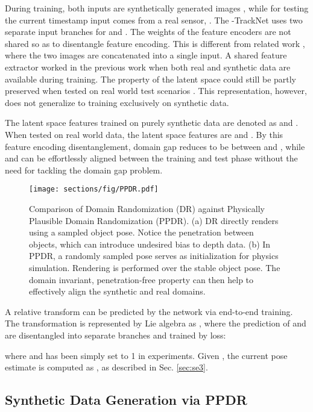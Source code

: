 \documentclass[letterpaper, 10 pt, conference]{ieeeconf}
\begin{document}
During training, both inputs are synthetically generated images , while for testing the current timestamp input comes from a real sensor, . The -TrackNet uses two separate input branches for  and . The weights of the feature encoders are not shared so as to disentangle feature encoding. This is different from related work \cite{li2018deepim}, where the two images are concatenated into a single input. A shared feature extractor worked in the previous work when both real and synthetic data are available during training. The property of the latent space  could still be partly preserved when tested on real world test scenarios . This representation, however, does not generalize to training exclusively on synthetic data. 

The latent space features trained on purely synthetic data are denoted as  and . When tested on real world data, the latent space features are  and . By this feature encoding disentanglement, domain gap reduces to be between  and , while  and  can be effortlessly aligned between the training and test phase without the need for tackling the domain gap problem. 

\begin{figure}[t!]
  \centering
  \texttt{[image: sections/fig/PPDR.pdf]}
  \vspace{-.1in}
  \caption{Comparison of Domain Randomization (DR) against  Physically Plausible Domain Randomization (PPDR). (a) DR directly renders using a sampled object pose. Notice the penetration between objects, which can introduce undesired bias to depth data. (b) In PPDR, a randomly sampled pose serves as initialization for physics simulation. Rendering is performed over the stable object pose. The domain invariant, penetration-free property can then help to effectively align the synthetic and real domains. \vspace{-0.2in}}
  \label{fig:PPDR}
\end{figure}

A relative transform can be predicted by the network via end-to-end training. The transformation is represented by Lie algebra as , where the prediction of  and  are disentangled into separate branches and trained by  loss: 
\vspace{-0.15in}

\noindent where  and  has been simply set to 1 in experiments. Given , the current pose estimate is computed as  , as described in Sec. \ref{sec:se3}. 

\label{sec:syn_data_gen}
\subsection{Synthetic Data Generation via PPDR}
\end{document}
